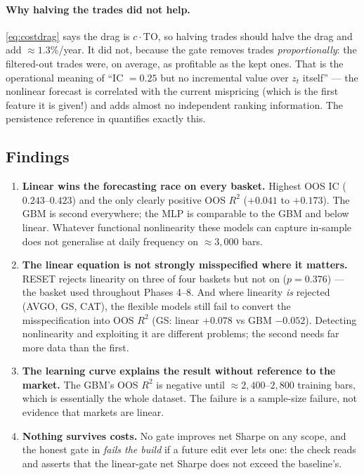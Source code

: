 \paragraph{Why halving the trades did not help.} \eqref{eq:costdrag} says the drag is
$c\cdot\mathrm{TO}$, so halving trades should halve the drag and add $\approx1.3\%$/year.
It did not, because the gate removes trades \emph{proportionally}: the filtered-out trades
were, on average, as profitable as the kept ones. That is the operational meaning of
``IC $=0.25$ but no incremental value over $z_t$ itself'' --- the nonlinear forecast is
correlated with the current mispricing (which is the first feature it is given!) and adds
almost no independent ranking information. The persistence reference in
 quantifies exactly this.

\subsection{Findings}

\begin{enumerate}[label=\textbf{N\arabic*.}]
  \item \textbf{Linear wins the forecasting race on every basket.} Highest OOS IC
    ($0.243$--$0.423$) and the only clearly positive OOS $R^2$ ($+0.041$ to $+0.173$). The
    GBM is second everywhere; the MLP is comparable to the GBM and below linear. Whatever
    functional nonlinearity these models can capture in-sample does not generalise at
    daily frequency on $\approx3{,}000$ bars.
  \item \textbf{The linear equation is not strongly misspecified where it matters.} RESET
    rejects linearity on three of four baskets but not on  ($p=0.376$) --- the
    basket used throughout Phases 4--8. And where linearity \emph{is} rejected (AVGO, GS,
    CAT), the flexible models still fail to convert the misspecification into OOS $R^2$
    (GS: linear $+0.078$ vs GBM $-0.052$). Detecting nonlinearity and exploiting it are
    different problems; the second needs far more data than the first.
  \item \textbf{The learning curve explains the result without reference to the market.}
    The GBM's OOS $R^2$ is negative until $\approx2{,}400$--$2{,}800$ training bars, which
    is essentially the whole dataset. The failure is a sample-size failure, not evidence
    that markets are linear.
  \item \textbf{Nothing survives costs.} No gate improves net Sharpe on any scope, and the
    honest gate in  \emph{fails the build} if a future edit ever
    lets one: the check reads  and asserts that the
    linear-gate net Sharpe does not exceed the baseline's.
\end{enumerate}

